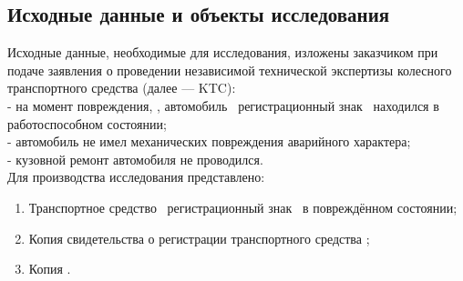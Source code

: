 \setcounter{page}{1}








\subsection{Исходные данные и объекты исследования} 
Исходные  данные,  необходимые  для   исследования,  изложены   заказчиком при подаче заявления о проведении  независимой технической экспертизы   колесного  транспортного  средства (далее —  KTC):\\
- на момент повреждения, , автомобиль \, регистрационный знак \, находился в работоспособном состоянии;\\
- автомобиль не имел механических  повреждения аварийного характера;\\
- кузовной ремонт автомобиля не проводился.\\
  
Для производства исследования представлено:
\begin{enumerate}
\item Транспортное средство \, регистрационный знак   \, в повреждённом состоянии;
\item Копия свидетельства о регистрации транспортного средства ;
\item Копия . %
	\end{enumerate}
%
%
%
